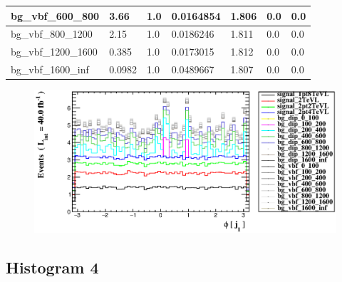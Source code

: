\documentclass[a4paper, 10pt]{article}
\begin{document}
\begin{table}[H]
\begin{center}
\begin{tabular}{|m{23.0mm}|m{23.0mm}|m{18.0mm}|m{19.0mm}|m{19.0mm}|m{19.0mm}|m{19.0mm}|}
      \hline
      {\cellcolor{white}         bg\_vbf\_600\_800}& {\cellcolor{white}         3.66}& {\cellcolor{white}         1.0}& {\cellcolor{white}         0.0164854}& {\cellcolor{white}         1.806}& {\cellcolor{green}         0.0}& {\cellcolor{green}         0.0}\\
      \hline
      {\cellcolor{white}         bg\_vbf\_800\_1200}& {\cellcolor{white}         2.15}& {\cellcolor{white}         1.0}& {\cellcolor{white}         0.0186246}& {\cellcolor{white}         1.811}& {\cellcolor{green}         0.0}& {\cellcolor{green}         0.0}\\
      \hline
      {\cellcolor{white}         bg\_vbf\_1200\_1600}& {\cellcolor{white}         0.385}& {\cellcolor{white}         1.0}& {\cellcolor{white}         0.0173015}& {\cellcolor{white}         1.812}& {\cellcolor{green}         0.0}& {\cellcolor{green}         0.0}\\
      \hline
      {\cellcolor{white}         bg\_vbf\_1600\_inf}& {\cellcolor{white}         0.0982}& {\cellcolor{white}         1.0}& {\cellcolor{white}         0.0489667}& {\cellcolor{white}         1.807}& {\cellcolor{green}         0.0}& {\cellcolor{green}         0.0}\\
\hline
    \end{tabular}
  \end{center}
\end{table}

\begin{figure}[H]
  \begin{center}
    \includegraphics[scale=0.45]{selection_2.eps}\\
\caption{   }
  \end{center}
\end{figure}
      \newpage
\subsection{ Histogram 4}
\end{document}
